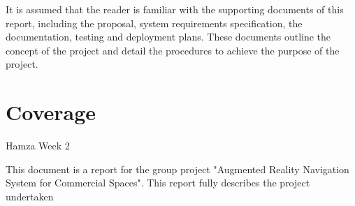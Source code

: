 It is assumed that the reader is familiar with the supporting documents of this report, including the proposal, system requirements specification, the documentation, testing and deployment plans. These documents outline the concept of the project and detail the procedures to achieve the purpose of the project.

\section{Coverage}
Hamza Week 2


This document is a report for the group project "Augmented Reality Navigation System for Commercial Spaces". This report fully describes the project undertaken  


